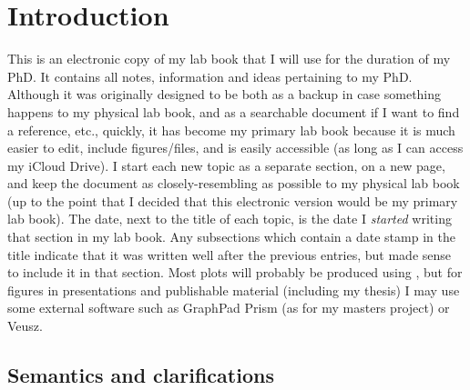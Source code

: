 \chapter{Introduction}
\label{sec:introduction}

This is an electronic copy of my lab book that I will use for the duration of my PhD. It contains all notes, information and ideas pertaining to my PhD. Although it was originally designed to be both as a backup in case something happens to my physical lab book, and as a searchable document if I want to find a reference, etc., quickly, it has become my primary lab book because it is much easier to edit, include figures/files, and is easily accessible (as long as I can access my iCloud Drive). I start each new topic as a separate section, on a new page, and keep the document as closely-resembling as possible to my physical lab book (up to the point that I decided that this electronic version would be my primary lab book). The date, next to the title of each topic, is the date I \emph{started} writing that section in my lab book. Any subsections which contain a date stamp in the title indicate that it was written well after the previous entries, but made sense to include it in that section. Most plots will probably be produced using \ROOT, but for figures in presentations and publishable material (including my thesis) I may use some external software such as GraphPad Prism (as for my masters project) or Veusz.

\section{Semantics and clarifications}

